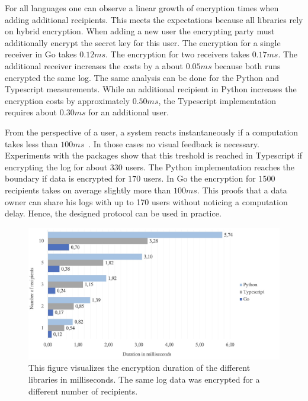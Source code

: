 \documentclass[../main.tex]{subfiles}
\begin{document}
For all languages one can observe a linear growth of encryption times when adding additional recipients.
This meets the expectations because all libraries rely on hybrid encryption.
When adding a new user the encrypting party must additionally encrypt the secret key for this user.
The encryption for a single receiver in Go takes $0.12ms$.
The encryption for two receivers takes $0.17ms$.
The additional receiver increases the costs by a about $0.05ms$ because both runs encrypted the same log.
The same analysis can be done for the Python and Typescript measurements.
While an additional recipient in Python increases the encryption costs by approximately $0.50ms$, the Typescript implementation requires about $0.30ms$ for an additional user.

From the perspective of a user, a system reacts instantaneously if a computation takes less than $100ms$~\cite{Nielson1993}.
In those cases no visual feedback is necessary.
Experiments with the packages show that this treshold is reached in Typescript if encrypting the log for about $330$ users.
The Python implementation reaches the boundary if data is encrypted for $170$ users.
In Go the encryption for $1500$ recipients takes on average slightly more than $100ms$.
This proofs that a data owner can share his logs with up to 170 users without noticing a computation delay.
Hence, the designed protocol can be used in practice.




\begin{figure}[ht]
    \includegraphics[scale=0.3]{../img/07/performance_tests.jpg}
    \centering
    \caption[Encryption duration]{This figure visualizes the encryption duration of the different libraries in milliseconds. The same log data was encrypted for a different number of recipients.}
    \label{fig:performance}
\end{figure}
\end{document}
